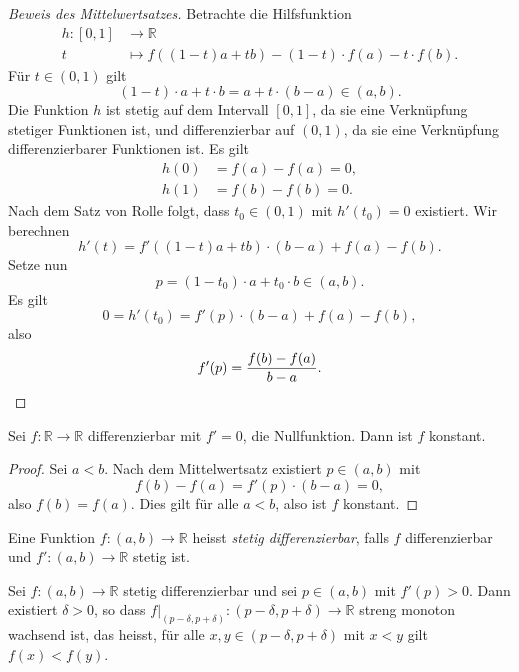 \documentclass[../main.tex]{subfiles}
\begin{document}
\begin{proof}[Beweis des Mittelwertsatzes]
  Betrachte die Hilfsfunktion 
  \begin{align*}
    h \colon [0, 1] & \to \mathbb{R} \\
    t & \mapsto f((1- t)a + tb) - (1-t) \cdot f(a) - t\cdot f(b).
  \end{align*}
  Für $t \in (0, 1)$ gilt
  \[
    (1- t) \cdot a + t \cdot b = a + t \cdot (b-a) \in (a, b).
  \]
  Die Funktion $h$ ist stetig auf dem Intervall $[0, 1]$,
  da sie eine Verknüpfung stetiger Funktionen ist,
  und differenzierbar auf $(0, 1)$, da sie eine Verknüpfung
  differenzierbarer Funktionen ist.
  Es gilt
  \begin{align*}
    h(0) &= f(a) - f(a) = 0,\\
    h(1) & = f(b) - f(b) = 0.
  \end{align*}
  Nach dem Satz von Rolle folgt, dass
  $t_0 \in (0, 1)$ mit $h'(t_0) = 0$ 
  existiert.
  Wir berechnen \[
    h'(t)  = f'((1-t)a + tb) \cdot (b-a) 
  + f(a) - f(b). \]
  Setze nun
  \[
    p = (1- t_0) \cdot a + t_0 \cdot b \in (a, b).
  \]
  Es gilt
  \[
    0 = h'(t_0) = f'(p) \cdot (b-a) + f(a) - f(b),
  \]
  also
  \[
    f'(p) = \frac{f(b) - f(a)}{b-a}. \qedhere
  \]
\end{proof}

\begin{corollary}
  Sei $f \colon \mathbb{R} \to \mathbb{R}$ differenzierbar
  mit $f' = 0$, die Nullfunktion.
  Dann ist $f$ konstant.
\end{corollary}

\begin{proof}
  Sei $a < b$. Nach dem Mittelwertsatz
  existiert $p \in (a, b)$ mit
  \[
    f(b) - f(a) = f'(p) \cdot (b-a) = 0,
  \]
  also $f(b) = f(a)$.
  Dies gilt für alle $a < b$, also
  ist $f$ konstant.
\end{proof}

\begin{definition}
  Eine Funktion $f \colon (a, b) \to \mathbb{R}$ 
  heisst \emph{stetig differenzierbar}, falls
  $f$ differenzierbar und $f' \colon (a, b) \to \mathbb{R}$ 
  stetig ist.
\end{definition}


\begin{corollary}\label{cor:strictly-monotone}
  Sei $f \colon (a, b) \to \mathbb{R}$ 
  stetig differenzierbar und sei
  $p \in (a, b)$ mit $f'(p) > 0$.
  Dann existiert $\delta > 0$,
  so dass $f|_{(p- \delta, p + \delta)}
  \colon (p - \delta, p + \delta) \to \mathbb{R}$ 
  streng monoton wachsend ist,
  das heisst, für alle $x, y \in (p - \delta, p + \delta)$ 
  mit $x < y$ gilt
  $f(x) < f(y)$.
\end{corollary}
\end{document}
